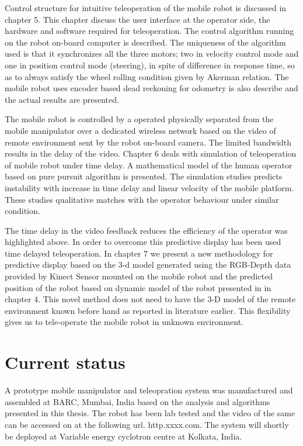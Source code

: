 Control structure for intuitive teleoperation of the mobile robot is discussed in chapter 5. This chapter discuss the user interface at the operator side, the hardware and software required for teleoperation. The control algorithm running on the robot on-board computer is described. The uniqueness of the algorithm used is that it synchronizes all the three motors; two in velocity control mode and one in position control mode (steering), in spite of difference in response time, so as to always satisfy the wheel rolling condition given by Akerman relation. The mobile robot uses encoder based dead reckoning for odometry is also describe and the actual results are presented.    

The mobile robot is controlled by a operated physically separated from the mobile manipulator over a dedicated wireless network based on the video of remote environment sent by the robot on-board camera. The limited bandwidth results in the delay of the video. Chapter 6 deals with simulation of teleoperation of mobile robot under time delay. A mathematical model of the human operator based on pure pursuit algorithm is presented. The simulation studies predicts instability with increase in time delay and linear velocity of the mobile platform. These studies qualitative matches with the operator behaviour under similar condition.

   The time delay in the video feedback reduces the efficiency of the operator was highlighted above. In order to overcome this predictive display has been used time delayed teleoperation. In chapter 7 we present a new methodology for predictive display based on the 3-d model generated using the RGB-Depth data provided by Kinect Sensor mounted on the mobile robot and the predicted position of the robot based on dynamic model of the robot presented in in chapter 4. This novel method does not need to have the 3-D model of the remote environment known before hand as reported in literature earlier.  This flexibility gives us to tele-operate  the mobile robot in unknown environment. 
   
   \section{Current status} 
   A prototype mobile manipulator and teleopration system  was   manufactured and assembled at BARC, Mumbai, India based on the analysis and algorithms presented in this thesis. The robot has been lab tested and the video of the same can be accessed on at the following url. http.xxxx.com. The system will  shortly  be deployed at Variable energy cyclotron centre at Kolkata, India. 


